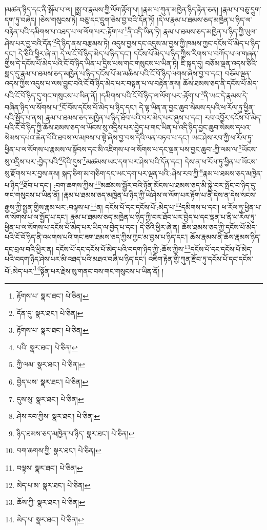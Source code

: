 །མཚན་ཉིད་དང་ནི་སྒོམ་པ་ལ། །སྨྲ་བ་རྣམས་ཀྱི་ལོག་རྟོག་པ། །རྣམ་པ་ཀུན་མཁྱེན་ཉིད་རྟེན་ཅན། །རྣམ་པ་བཅུ་དྲུག་དག་ཏུ་བཞེད། །ཅེས་གསུངས་ཏེ། བཅུ་དང་དྲུག་ཅེས་བྱ་བའི་དོན་ཏོ། །དེ་ལ་རྣམ་པ་ཐམས་ཅད་མཁྱེན་པ་ཉིད་ལ་བརྟེན་པའི་དམིགས་པ་འཐད་པ་ལ་ལོག་པར་:རྟོག་པ་\footnote{རྟོགས་པ་  སྣར་ཐང་།  པེ་ཅིན། }ནི་འདི་ཡིན་ཏེ། རྣམ་པ་ཐམས་ཅད་མཁྱེན་པ་ཉིད་ཀྱི་ཡུལ་ཤེས་པར་བྱ་བའི་དོན་\footnote{དོན་དུ་  སྣར་ཐང་།  པེ་ཅིན། }དེ་ཉིད་ནས་བརྩམས་ཏེ། འདུས་བྱས་དང་འདུས་མ་བྱས་ཀྱི་ཁམས་ཀྱང་དངོས་པོ་མེད་པ་ཉིད་དང་། དེ་ཅིའི་ཕྱིར་ཞེ་ན། དེ་ལ་ངོ་བོ་ཉིད་མེད་པ་ཉིད་དང་། དངོས་པོ་མེད་པ་ཉིད་ཀྱིས་རིགས་པ་བཀོད་པ་ལ་གཞན་གྱིས་དེ་དངོས་པོ་མེད་པའི་ངོ་བོ་ཉིད་ཡིན་པ་དྲིས་པས་གང་གསུངས་པ་ཡིན་ཏེ། ཇི་སྐད་དུ། བཅོམ་ལྡན་འདས་ཅིའི་སླད་དུ་རྣམ་པ་ཐམས་ཅད་མཁྱེན་པ་ཉིད་དངོས་པོ་མ་མཆིས་པའི་ངོ་བོ་ཉིད་ལགས་ཞེས་བྱ་བ་དང་། བཅོམ་ལྡན་འདས་ཀྱིས་འདུས་པ་ལས་བྱུང་བའི་ངོ་བོ་ཉིད་མེད་པར་བསྟན་པ་ལ་བརྟེན་ནས། ཆོས་ཐམས་ཅད་ནི་དངོས་པོ་མེད་པའི་ངོ་བོ་ཉིད་དུ་གང་གསུངས་པ་ཡིན་ནོ། །དམིགས་པའི་ངོ་བོ་ཉིད་ལ་ལོག་པར་:རྟོག་པ་\footnote{རྟོགས་པ་  སྣར་ཐང་།  པེ་ཅིན། }ནི་ཡང་དེ་རྣམས་དེ་བཞིན་ཉིད་ལ་སོགས་པ་\footnote{པའི་  སྣར་ཐང་།  པེ་ཅིན། }ངོ་བོས་དངོས་པོ་མེད་པ་ཉིད་དང་། དེ་ལྟ་ཡིན་ན་བྱང་ཆུབ་སེམས་དཔའི་ཕ་རོལ་ཏུ་ཕྱིན་པའི་སྤྱོད་པ་ནས། རྣམ་པ་ཐམས་ཅད་མཁྱེན་པ་ཉིད་ཐོབ་པའི་བར་མེད་པར་ཞུས་པ་དང་། རབ་འབྱོར་དངོས་པོ་མེད་པའི་ངོ་བོ་ཉིད་ཀྱི་ཆོས་ཐམས་ཅད་ལ་ཡོངས་སུ་འདྲིས་པར་བྱེད་པ་གང་ཡིན་པ་འདི་ཉིད་བྱང་ཆུབ་སེམས་དཔའ་སེམས་དཔའ་ཆེན་པོའི་ཐབས་ལ་མཁས་པ་སྟེ་ཞེས་བྱ་བས་དེའི་ལན་བཏབ་པ་དང་། ཡང་ཤེས་རབ་ཀྱི་ཕ་རོལ་ཏུ་ཕྱིན་པ་ལ་སོགས་པ་རྣམས་ལ་སྟོབས་དང་མི་འཇིགས་པ་ལ་སོགས་པ་དང་ལྡན་པས་བྱང་ཆུབ་:ཀྱི་ལམ་ལ་\footnote{ཀྱི་ལམ་  སྣར་ཐང་།  པེ་ཅིན། }ཡོངས་སུ་འདྲིས་པར་:བྱེད་པའི་\footnote{བྱེད་པས་  སྣར་ཐང་།  པེ་ཅིན། }དེའི་དུས་\footnote{དུས་སུ་  སྣར་ཐང་།  པེ་ཅིན། }མཚམས་ཡང་དག་པར་ཤེས་པའི་དོན་དང་། དེས་ན་ཕ་རོལ་ཏུ་ཕྱིན་པ་ཡོངས་སུ་རྫོགས་པར་བྱས་ནས། སྐད་ཅིག་མ་གཅིག་དང་ཡང་དག་པར་ལྡན་པའི་:ཤེས་རབ་ཀྱི་\footnote{ཤེས་རབ་ཀྱིས་  སྣར་ཐང་།  པེ་ཅིན། }རྣམ་པ་ཐམས་ཅད་མཁྱེན་པ་ཉིད་\footnote{ཉིད་ཐམས་ཅད་མཁྱེན་པ་ཉིད་  སྣར་ཐང་།  པེ་ཅིན། }ཐོབ་པ་དང་། :བག་ཆགས་ཀྱིས་\footnote{བག་ཆགས་ཀྱི་  སྣར་ཐང་།  པེ་ཅིན། }མཚམས་སྦྱོར་བའི་ཉོན་མོངས་པ་ཐམས་ཅད་མི་སྐྱེ་བར་སྤོང་བ་ཉིད་དུ་གང་གསུངས་པ་ཡིན་ནོ། །རྣམ་པ་ཐམས་ཅད་མཁྱེན་པ་ཉིད་ཀྱི་ཡེ་ཤེས་ལ་ལོག་པར་རྟོག་པ་ནི་དེས་ན་དེས་སངས་རྒྱས་ཀྱི་སྤྱན་གྱིས་རྣམ་པར་:བལྟས་པ་\footnote{བལྟས་  སྣར་ཐང་།  པེ་ཅིན། }ན། དངོས་པོ་དང་དངོས་པོ་:མེད་པ་\footnote{མེད་པ་མ་  སྣར་ཐང་།  པེ་ཅིན། }དམིགས་པ་དང་། ཕ་རོལ་ཏུ་ཕྱིན་པ་ལ་སོགས་པ་ལ་སྤྱོད་པ་དང་། རྣམ་པ་ཐམས་ཅད་མཁྱེན་པ་ཉིད་ཀྱི་བར་ཐོབ་པར་བྱེད་པ་དང་ལྡན་པ་ནི་ཕ་རོལ་ཏུ་ཕྱིན་པ་ལ་སོགས་པ་དངོས་པོ་མེད་པར་ཡིད་ལ་བྱེད་པ་དང་། དེ་ཅིའི་ཕྱིར་ཞེ་ན། ཆོས་ཐམས་ཅད་ཀྱི་དངོས་པོ་མེད་པའི་ངོ་བོ་ཉིད་ནི་འཕགས་པའི་གང་ཟག་ཐམས་ཅད་ཀྱིས་ཀྱང་མ་བྱས་པ་ཉིད་དང་། ཆོས་རྣམས་ནི་ཆོས་རྣམས་ཉིད་དང་བྲལ་བའི་ཕྱིར་ན། དངོས་པོ་དང་དངོས་པོ་མེད་པའི་བདག་ཉིད་ཀྱི་:ཆོས་ཀྱིས་\footnote{ཆོས་ཀྱི་  སྣར་ཐང་།  པེ་ཅིན། }དངོས་པོ་དང་དངོས་པོ་མེད་པའི་བདག་ཉིད་ཤེས་པར་མི་འཐད་པའི་མཐའ་བཞི་པ་ཉིད་དང་། འཇིག་རྟེན་གྱི་ཀུན་རྫོབ་ཏུ་དངོས་པོ་དང་དངོས་པོ་:མེད་པར་\footnote{མེད་པ་  སྣར་ཐང་།  པེ་ཅིན། }སྟོན་པར་རྗེས་སུ་གནང་བས་གང་གསུངས་པ་ཡིན་ནོ། །
